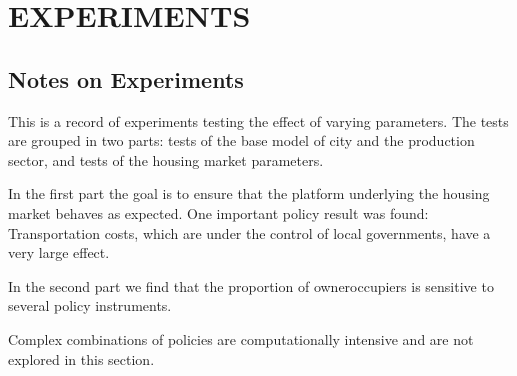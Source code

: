 


% 
\chapter{EXPERIMENTS}
\section{Notes on Experiments}
This is a record of experiments testing the effect of varying parameters. The tests are grouped in two parts: tests of the base model of city and the production sector, and tests of the housing market parameters. 

In the first part the goal is to ensure that the platform underlying the housing market behaves as expected. One important policy result was found: Transportation costs, which are under the control of local governments, have a very large effect.

In the second part we find that the proportion of owneroccupiers is sensitive to  several policy instruments. 

Complex combinations of policies are computationally intensive and are not explored in this section.

\vspace{.5cm}

